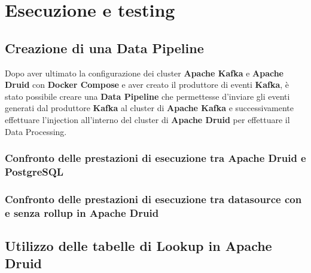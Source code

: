 \section{Esecuzione e testing}
\subsection{Creazione di una Data Pipeline}
Dopo aver ultimato la configurazione dei \gls{cluster}{} \textbf{Apache Kafka} e \textbf{Apache Druid} con \textbf{Docker Compose} 
e aver creato il produttore di eventi \textbf{Kafka}, è stato possibile creare una \textbf{Data Pipeline} che permettesse d'inviare gli eventi generati dal produttore \textbf{Kafka} al \gls{cluster}{} di \textbf{Apache Kafka} e 
successivamente effettuare l'\gls{injection}{} all'interno del \gls{cluster}{} di \textbf{Apache Druid} per effettuare il \gls{Data Processing}.
\subsubsection{Confronto delle prestazioni di esecuzione tra Apache Druid e PostgreSQL}
\subsubsection{Confronto delle prestazioni di esecuzione tra datasource con e senza rollup in Apache Druid}
\subsection{Utilizzo delle tabelle di Lookup in Apache Druid}
\newpage
\pagestyle{empty}
\null %
\newpage